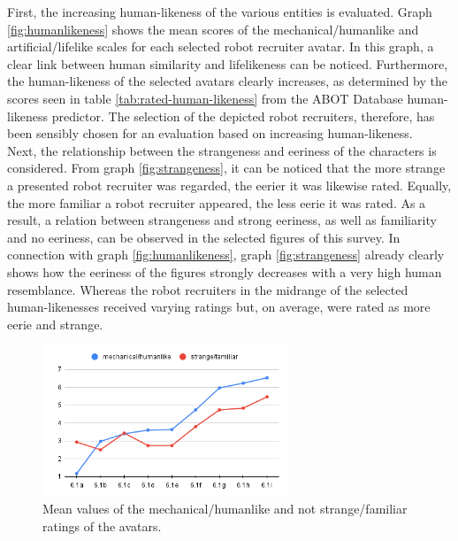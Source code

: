 First, the increasing human-likeness of the various entities is evaluated. Graph \ref{fig:humanlikeness} shows the mean scores of the mechanical/humanlike and artificial/lifelike scales for each selected robot recruiter avatar. In this graph, a clear link between human similarity and lifelikeness can be noticed. Furthermore, the human-likeness of the selected avatars clearly increases, as determined by the scores seen in table \ref{tab:rated-human-likeness} from the ABOT Database human-likeness predictor. The selection of the depicted robot recruiters, therefore, has been sensibly chosen for an evaluation based on increasing human-likeness.\\
Next, the relationship between the strangeness and eeriness of the characters is considered. From graph \ref{fig:strangeness}, it can be noticed that the more strange a presented robot recruiter was regarded, the eerier it was likewise rated. Equally, the more familiar a robot recruiter appeared, the less eerie it was rated. As a result, a relation between strangeness and strong eeriness, as well as familiarity and no eeriness, can be observed in the selected figures of this survey. In connection with graph \ref{fig:humanlikeness}, graph \ref{fig:strangeness} already clearly shows how the eeriness of the figures strongly decreases with a very high human resemblance. Whereas the robot recruiters in the midrange of the selected human-likenesses received varying ratings but, on average, were rated as more eerie and strange.\par
\begin{figure} %
    \centering
    \includegraphics[width=0.65\textwidth]{graphics/result/result3.png}
    \caption{Mean values of the mechanical/humanlike and not strange/familiar ratings of the avatars.}
    \label{fig:uncanny_valley_result}
\end{figure}
